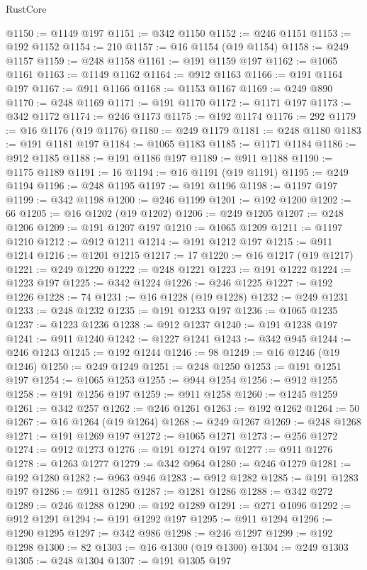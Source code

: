 \begin{lexlean}{RustCore}
\begin{coremodule}
@1150 := @1149 @197
@1151 := @342 @1150
@1152 := @246 @1151
@1153 := @192 @1152
@1154 := 210
@1157 := @16 @1154 (@19 @1154)
@1158 := @249 @1157
@1159 := @248 @1158
@1161 := @191 @1159 @197
@1162 := @1065 @1161
@1163 := @1149 @1162
@1164 := @912 @1163
@1166 := @191 @1164 @197
@1167 := @911 @1166
@1168 := @1153 @1167
@1169 := @249 @890
@1170 := @248 @1169
@1171 := @191 @1170
@1172 := @1171 @197
@1173 := @342 @1172
@1174 := @246 @1173
@1175 := @192 @1174
@1176 := 292
@1179 := @16 @1176 (@19 @1176)
@1180 := @249 @1179
@1181 := @248 @1180
@1183 := @191 @1181 @197
@1184 := @1065 @1183
@1185 := @1171 @1184
@1186 := @912 @1185
@1188 := @191 @1186 @197
@1189 := @911 @1188
@1190 := @1175 @1189
@1191 := 16
@1194 := @16 @1191 (@19 @1191)
@1195 := @249 @1194
@1196 := @248 @1195
@1197 := @191 @1196
@1198 := @1197 @197
@1199 := @342 @1198
@1200 := @246 @1199
@1201 := @192 @1200
@1202 := 66
@1205 := @16 @1202 (@19 @1202)
@1206 := @249 @1205
@1207 := @248 @1206
@1209 := @191 @1207 @197
@1210 := @1065 @1209
@1211 := @1197 @1210
@1212 := @912 @1211
@1214 := @191 @1212 @197
@1215 := @911 @1214
@1216 := @1201 @1215
@1217 := 17
@1220 := @16 @1217 (@19 @1217)
@1221 := @249 @1220
@1222 := @248 @1221
@1223 := @191 @1222
@1224 := @1223 @197
@1225 := @342 @1224
@1226 := @246 @1225
@1227 := @192 @1226
@1228 := 74
@1231 := @16 @1228 (@19 @1228)
@1232 := @249 @1231
@1233 := @248 @1232
@1235 := @191 @1233 @197
@1236 := @1065 @1235
@1237 := @1223 @1236
@1238 := @912 @1237
@1240 := @191 @1238 @197
@1241 := @911 @1240
@1242 := @1227 @1241
@1243 := @342 @945
@1244 := @246 @1243
@1245 := @192 @1244
@1246 := 98
@1249 := @16 @1246 (@19 @1246)
@1250 := @249 @1249
@1251 := @248 @1250
@1253 := @191 @1251 @197
@1254 := @1065 @1253
@1255 := @944 @1254
@1256 := @912 @1255
@1258 := @191 @1256 @197
@1259 := @911 @1258
@1260 := @1245 @1259
@1261 := @342 @257
@1262 := @246 @1261
@1263 := @192 @1262
@1264 := 50
@1267 := @16 @1264 (@19 @1264)
@1268 := @249 @1267
@1269 := @248 @1268
@1271 := @191 @1269 @197
@1272 := @1065 @1271
@1273 := @256 @1272
@1274 := @912 @1273
@1276 := @191 @1274 @197
@1277 := @911 @1276
@1278 := @1263 @1277
@1279 := @342 @964
@1280 := @246 @1279
@1281 := @192 @1280
@1282 := @963 @946
@1283 := @912 @1282
@1285 := @191 @1283 @197
@1286 := @911 @1285
@1287 := @1281 @1286
@1288 := @342 @272
@1289 := @246 @1288
@1290 := @192 @1289
@1291 := @271 @1096
@1292 := @912 @1291
@1294 := @191 @1292 @197
@1295 := @911 @1294
@1296 := @1290 @1295
@1297 := @342 @986
@1298 := @246 @1297
@1299 := @192 @1298
@1300 := 82
@1303 := @16 @1300 (@19 @1300)
@1304 := @249 @1303
@1305 := @248 @1304
@1307 := @191 @1305 @197

\end{coremodule}
\end{lexlean}
